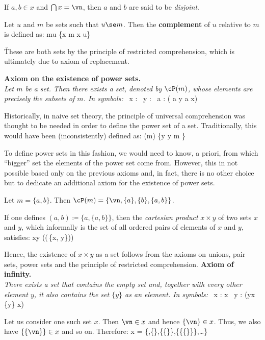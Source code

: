 If $a,b\in x$ and $\bigcap x = \vn$, then $a$ and $b$ are said to be \emph{disjoint}.
\ed

\bd [Complement]
Let $u$ and $m$ be sets such that $u \se m$. Then the \textbf{complement} of $u$ relative to $m$ is defined as:
\bse
m\sm u \coloneqq \{x \in m \mid x \notin u\}
\ese

\v

These are both sets by the principle of restricted comprehension, which is ultimately due to axiom of replacement.
\ed

\textbf{Axiom on the existence of power sets.} \\
\emph{Let $m$ be a set. Then there exists a set, denoted by $\cP(m)$, whose elements are precisely the subsets of $m$.
In symbols:}
\bse
\forall \, x : \exists \, y : \forall \, a : ( a \in y \eqv a \se x)
\ese

Historically, in naive set theory, the principle of universal comprehension was thought to be needed in order to
define the power set of a set. Traditionally, this would have been (inconsistently) defined as:
\bse
\cP (m) \coloneqq \{y \mid y \se m \}
\ese

To define power sets in this fashion, we would need to know, a priori, from which ``bigger'' set the elements of the
power set come from. However, this in not possible based only on the previous axioms and, in fact, there is no other
choice but to dedicate an additional axiom for the existence of power sets.

\be
Let $m = \{a,b\}$. Then $\cP(m)=\{\vn,\{a\},\{b\},\{a,b\}\}$.
\ee

If one defines $\left(a,b\right) \coloneqq \{a,\{a,b\}\}$, then the \emph{cartesian product} $x \times y$ of two sets
$x$ and $y$, which informally is the set of all ordered pairs of elements of $x$ and $y$, satisfies:
\bse
x\times y \se \cP(\cP(\bigcup\,\{x, y\}))
\ese

Hence, the existence of $x\times y$ as a set follows from the axioms on unions, pair sets, power sets and the
principle of restricted comprehension. \v

\textbf{Axiom of infinity.} \\
\emph{There exists a set that contains the empty set and, together with every other element $y$, it also contains the
set $\{y\}$ as an element. In symbols:}
\bse
\exists \, x : \vn \in x \land \forall \, y : (y\in x \imp \{y\} \in x)
\ese

Let us consider one such set $x$. Then $\vn \in x$ and hence $\{\vn\}\in x$. Thus, we also have $\{\{\vn\}\}\in x$
and so on. Therefore:
\bse
x = \{\vn,\{\vn\},\{\{\vn\}\},\{\{\{\vn\}\}\},\ldots\}
\ese

